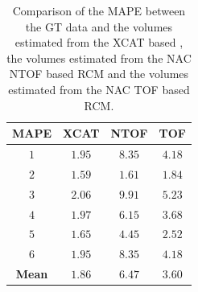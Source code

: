             \begin{table}
                \centering
                
                \captionsetup{singlelinecheck=false, justification=raggedright}
                \caption{Comparison of the \gls{MAPE} between the \gls{GT} data and the volumes estimated from the \gls{XCAT} based , the volumes estimated from the \gls{NAC} \gls{NTOF} based \gls{RCM} and the volumes estimated from the \gls{NAC} \gls{TOF} based \gls{RCM}.}
                
                \resizebox*{0.75\linewidth}{!}
                {
                    \begin{tabular}{||c|ccc||}
                        \hline
                        \textbf{\gls{MAPE}} & \textbf{XCAT} & \textbf{\gls{NTOF}} & \textbf{\gls{TOF}} \\
                        \hline
                        \textbf{$1$} & $1.95$ & $8.35$ & $4.18$ \\
                        \textbf{$2$} & $1.59$ & $1.61$ & $1.84$ \\
                        \textbf{$3$} & $2.06$ & $9.91$ & $5.23$ \\
                        \textbf{$4$} & $1.97$ & $6.15$ & $3.68$ \\
                        \textbf{$5$} & $1.65$ & $4.45$ & $2.52$ \\
                        \textbf{$6$} & $1.95$ & $8.35$ & $4.18$ \\
                        \hline
                        \textbf{Mean} & $1.86$ & $6.47$ & $3.60$ \\
                        \hline
                    \end{tabular}
                } \label{tab:impact_of_tof_on_respiratory_motion_model_estimation_using_pre_gated_no_intra_cycle_motion_nac_pet_results_mape}
            \end{table}
            
